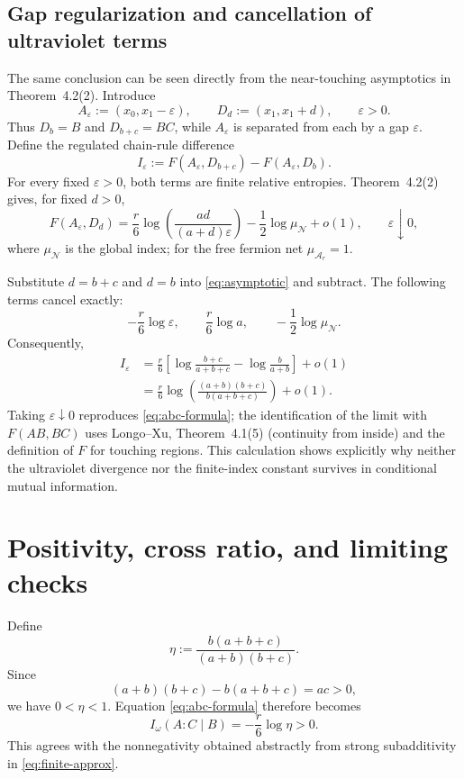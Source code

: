 \documentclass[11pt]{article}
\theoremstyle{accenttheorem}
\theoremstyle{definition}
\newcommand{\cN}{\mathcal{N}}
\newcommand{\Ar}{\mathcal{A}_{r}}
\newcommand{\MI}{F}
\newcommand{\CMI}{I_{\omega}}
\newcommand{\eps}{\varepsilon}
\newcommand{\1}{\mathbf{1}}
\begin{document}
\subsection{Gap regularization and cancellation of ultraviolet terms}

The same conclusion can be seen directly from the near-touching asymptotics in Theorem~4.2(2).  Introduce
\[
 A_{\eps}:=(x_0,x_1-\eps),\qquad
 D_d:=(x_1,x_1+d),\qquad \eps>0.
\]
Thus \(D_b=B\) and \(D_{b+c}=BC\), while \(A_{\eps}\) is separated from each by a gap \(\eps\).  Define the regulated chain-rule difference
\begin{equation}\label{eq:Ieps}
 I_{\eps}:=\MI(A_{\eps},D_{b+c})-\MI(A_{\eps},D_b).
\end{equation}
For every fixed \(\eps>0\), both terms are finite relative entropies.  Theorem~4.2(2) gives, for fixed \(d>0\),
\begin{equation}\label{eq:asymptotic}
 \MI(A_{\eps},D_d)
 =\frac{r}{6}\log\!\left(\frac{ad}{(a+d)\eps}\right)
  -\frac{1}{2}\log\mu_{\cN}+o(1),
 \qquad \eps\downarrow0,
\end{equation}
where \(\mu_{\cN}\) is the global index; for the free fermion net \(\mu_{\Ar}=1\).

Substitute \(d=b+c\) and \(d=b\) into \eqref{eq:asymptotic} and subtract.  The following terms cancel exactly:
\[
 -\frac{r}{6}\log\eps,\qquad
 \frac{r}{6}\log a,\qquad
 -\frac12\log\mu_{\cN}.
\]
Consequently,
\begin{align*}
 I_{\eps}
 &=\frac{r}{6}\left[
      \log\frac{b+c}{a+b+c}
      -\log\frac{b}{a+b}
    \right]+o(1)\\
 &=\frac{r}{6}\log\!\left(
      \frac{(a+b)(b+c)}{b(a+b+c)}
    \right)+o(1).
\end{align*}
Taking \(\eps\downarrow0\) reproduces \eqref{eq:abc-formula}; the identification of the limit with \(F(AB,BC)\) uses Longo--Xu, Theorem~4.1(5) (continuity from inside) and the definition of \(F\) for touching regions.  This calculation shows explicitly why neither the ultraviolet divergence nor the finite-index constant survives in conditional mutual information.

\section{Positivity, cross ratio, and limiting checks}

Define
\begin{equation}\label{eq:eta}
 \eta:=\frac{b(a+b+c)}{(a+b)(b+c)}.
\end{equation}
Since
\[
 (a+b)(b+c)-b(a+b+c)=ac>0,
\]
we have \(0<\eta<1\).  Equation \eqref{eq:abc-formula} therefore becomes
\begin{equation}\label{eq:cross-ratio-final}
 \CMI(A:C\mid B)=-\frac{r}{6}\log\eta>0.
\end{equation}
This agrees with the nonnegativity obtained abstractly from strong subadditivity in \eqref{eq:finite-approx}.
\end{document}
